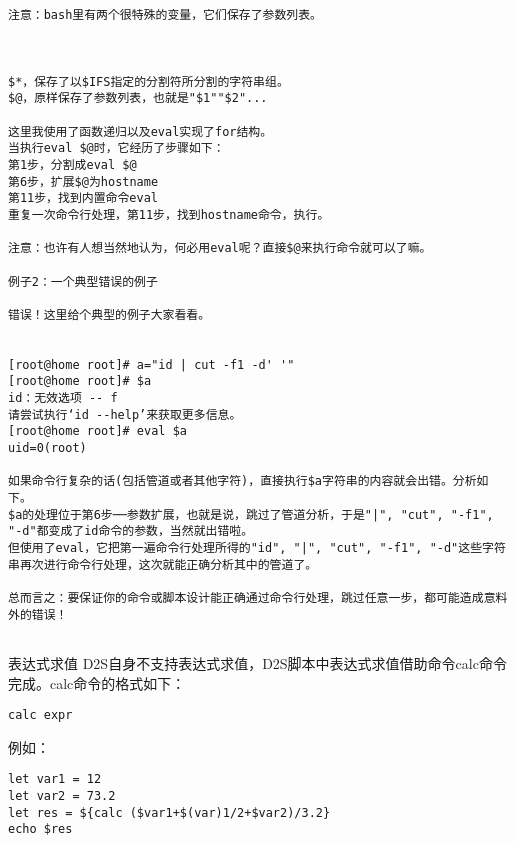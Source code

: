 \begin{lstlisting}
注意：bash里有两个很特殊的变量，它们保存了参数列表。

 

$*，保存了以$IFS指定的分割符所分割的字符串组。
$@，原样保存了参数列表，也就是"$1""$2"...

这里我使用了函数递归以及eval实现了for结构。
当执行eval $@时，它经历了步骤如下：
第1步，分割成eval $@
第6步，扩展$@为hostname
第11步，找到内置命令eval
重复一次命令行处理，第11步，找到hostname命令，执行。

注意：也许有人想当然地认为，何必用eval呢？直接$@来执行命令就可以了嘛。

例子2：一个典型错误的例子

错误！这里给个典型的例子大家看看。

 
[root@home root]# a="id | cut -f1 -d' '"
[root@home root]# $a
id：无效选项 -- f
请尝试执行‘id --help’来获取更多信息。
[root@home root]# eval $a
uid=0(root)

如果命令行复杂的话(包括管道或者其他字符)，直接执行$a字符串的内容就会出错。分析如下。
$a的处理位于第6步──参数扩展，也就是说，跳过了管道分析，于是"|", "cut", "-f1", "-d"都变成了id命令的参数，当然就出错啦。
但使用了eval，它把第一遍命令行处理所得的"id", "|", "cut", "-f1", "-d"这些字符串再次进行命令行处理，这次就能正确分析其中的管道了。

总而言之：要保证你的命令或脚本设计能正确通过命令行处理，跳过任意一步，都可能造成意料外的错误！


\end{lstlisting}



表达式求值
D2S自身不支持表达式求值，D2S脚本中表达式求值借助命令calc命令完成。calc命令的格式如下：
\begin{lstlisting}
calc expr
\end{lstlisting}
例如：
\begin{lstlisting}
let var1 = 12
let var2 = 73.2
let res = ${calc ($var1+$(var)1/2+$var2)/3.2}
echo $res
\end{lstlisting}

